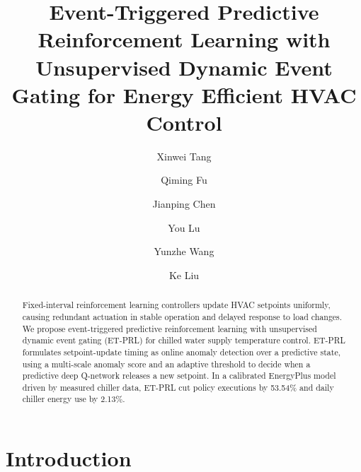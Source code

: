\documentclass[preprint,12pt]{elsarticle}
\begin{document}
\begin{frontmatter}

\title{Event-Triggered Predictive Reinforcement Learning with Unsupervised Dynamic Event Gating for Energy Efficient HVAC Control}

\author[inst1,inst2]{Xinwei Tang}
\author[inst1,inst2]{Qiming Fu}
\author[inst1,inst2,inst3]{Jianping Chen}
\author[inst1,inst2]{You Lu}
\author[inst1,inst2]{Yunzhe Wang}
\author[inst4]{Ke Liu}

\begin{abstract}
Fixed-interval reinforcement learning controllers update HVAC setpoints uniformly, causing redundant actuation in stable operation and delayed response to load changes. We propose event-triggered predictive reinforcement learning with unsupervised dynamic event gating (ET-PRL) for chilled water supply temperature control. ET-PRL formulates setpoint-update timing as online anomaly detection over a predictive state, using a multi-scale anomaly score and an adaptive threshold to decide when a predictive deep Q-network releases a new setpoint. In a calibrated EnergyPlus model driven by measured chiller data, ET-PRL cut policy executions by 53.54\% and daily chiller energy use by 2.13\%.
\end{abstract}


\end{frontmatter}


\section{Introduction}\label{introduction}
\end{document}
